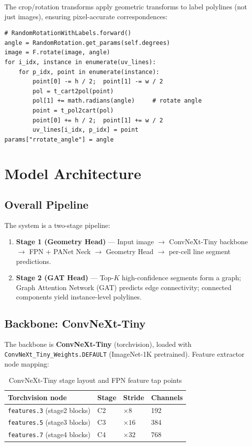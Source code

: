 \documentclass[11pt,a4paper]{article}
\begin{document}
The crop/rotation transforms apply geometric transforms to label polylines
(not just images), ensuring pixel-accurate correspondences:

\begin{lstlisting}
# RandomRotationWithLabels.forward()
angle = RandomRotation.get_params(self.degrees)
image = F.rotate(image, angle)
for i_idx, instance in enumerate(uv_lines):
    for p_idx, point in enumerate(instance):
        point[0] -= h / 2;  point[1] -= w / 2
        pol = t_cart2pol(point)
        pol[1] += math.radians(angle)     # rotate angle
        point = t_pol2cart(pol)
        point[0] += h / 2;  point[1] += w / 2
        uv_lines[i_idx, p_idx] = point
params["rrotate_angle"] = angle
\end{lstlisting}

\section{Model Architecture}
\label{sec:model}

\subsection{Overall Pipeline}
\label{subsec:pipeline}

The system is a two-stage pipeline:

\begin{enumerate}[leftmargin=*]
  \item \textbf{Stage 1 (Geometry Head)} --- Input image $\to$ ConvNeXt-Tiny backbone $\to$
        FPN + PANet Neck $\to$ Geometry Head $\to$ per-cell line segment predictions.
  \item \textbf{Stage 2 (GAT Head)} --- Top-$K$ high-confidence segments form a graph;
        Graph Attention Network (GAT) predicts edge connectivity; connected components
        yield instance-level polylines.
\end{enumerate}

\subsection{Backbone: ConvNeXt-Tiny}
\label{subsec:backbone}

The backbone is \textbf{ConvNeXt-Tiny} (torchvision), loaded with
\texttt{ConvNeXt\_Tiny\_Weights.DEFAULT} (ImageNet-1K pretrained).
Feature extractor node mapping:

\begin{table}[H]
\centering
\caption{ConvNeXt-Tiny stage layout and FPN feature tap points}
\begin{tabular}{llll}
\toprule
Torchvision node & Stage & Stride & Channels \\
\midrule
\texttt{features.3} (stage2 blocks) & C2 & $\times 8$  & 192 \\
\texttt{features.5} (stage3 blocks) & C3 & $\times 16$ & 384 \\
\texttt{features.7} (stage4 blocks) & C4 & $\times 32$ & 768 \\
\bottomrule
\end{tabular}
\end{table}
\end{document}
